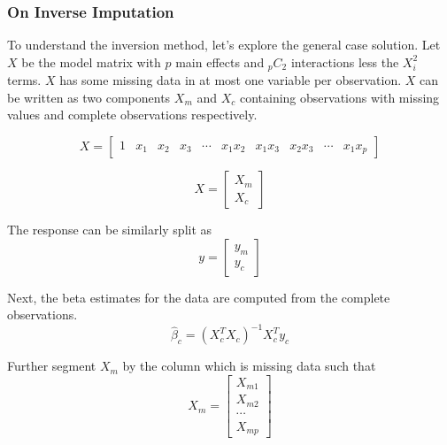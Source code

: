 \documentclass[../../paper.tex]{subfiles}
\begin{document}
\subsubsection*{On Inverse Imputation}
To understand the inversion method, let's explore the general case solution.
Let $X$ be the model matrix with $p$ main effects and ${}_{p}C_{2}$ interactions less the $X_{i}^2$ terms.
$X$ has some missing data in at most one variable per observation. $X$ can be
written as two components $X_{m}$ and $X_{c}$ containing observations with
 missing values and complete observations respectively.

\begin{equation}
  X =
  \begin{bmatrix}
  1 & x_{1} & x_{2} & x_{3} & \cdots & x_{1}x_{2} & x_{1}x_{3} & x_{2}x_{3} & \cdots & x_{1}x_{p} %
\end{bmatrix}
\end{equation}


\begin{equation}
  X = \begin{bmatrix}
  X_{m} \\
  X_{c}
\end{bmatrix}
\end{equation}

The response can be similarly split as
\begin{equation}
  y = \begin{bmatrix}
  y_{m} \\
  y_{c}
\end{bmatrix}
\end{equation}




Next, the beta estimates for the data are computed from the complete observations.
\begin{equation}
  \hat{\beta}_{c} = (X_{c}^{T}X_{c})^{-1} X_{c}^{T} y_{c}
\end{equation}

Further segment $X_{m}$ by the column which is missing data such that
\begin{equation}
  X_{m} =
\begin{bmatrix}
  X_{m1} \\
  X_{m2} \\
  \cdots \\
  X_{mp}
\end{bmatrix}
\end{equation}
\end{document}
